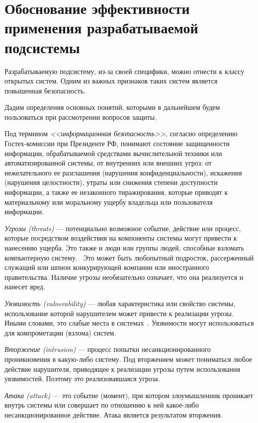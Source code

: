\chapter{Обоснование эффективности применения разрабатываемой подсистемы}

Разрабатываемую подсистему, из-за своей специфики, можно отнести к классу
открытых систем. Одним из важных признаков таких систем является повышенная безопасность.
~\cite{zapechnikov}

Дадим определения основных понятий, которыми в дальнейшем будем пользоваться при
рассмотрении вопросов защиты.

Под термином \textit{<<информационная безопасность>>}, согласно определению
Гостех-комиссии при Президенте РФ, понимают состояние защищенности информации,
обрабатываемой средствами вычислительной техники или автоматизированной системы,
от внутренних или внешних угроз:
от нежелательного ее разглашения (нарушения конфиденциальности), искажения
(нарушения целостности), утраты или снижения степени доступности информации, а
также ее незаконного тиражирования, которые приводят к материальному или
моральному ущербу владельца или пользователя информации.~\cite{ruk_doc}

\textit{Угрозы (threats)} --- потенциально возможное событие, действие или
процесс, которые посредством воздействия на компоненты системы могут привести к
нанесению ущерба. Это также и люди или группы людей, способные взломать
компьютерную систему.~\cite{gerasimenko} Это может быть любопытный подросток,
рассерженный служащий или шпион конкурирующей компании или иностранного правительства.
Наличие угрозы необязательно означает, что она реализуется и нанесет вред.

\textit{Уязвимость (vulnerability)} --- любая характеристика или свойство
системы, использование которой нарушителем может привести к реализации угрозы. Иными
словами, это слабые места в системах~\cite{gerasimenko}. Уязвимости могут использоваться для
компрометации (взлома) систем.

\textit{Вторжение (intrusion)} --- процесс попытки несанкционированного
проникновения в какую-либо систему. Под вторжением может пониматься любое действие нарушителя,
приводящее к реализации угрозы путем использования уязвимостей. Поэтому это
реализовавшаяся угроза.

\textit{Атака (attack)} --- это событие (момент), при котором злоумышленник
проникает внутрь системы или совершает по отношению к ней какое-либо несанкционированное
действие. Атака является результатом вторжения.

